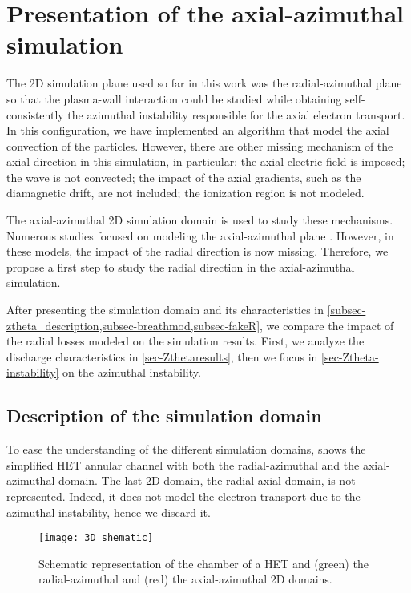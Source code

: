 
\section{Presentation of the axial-azimuthal simulation}

The \ac{2D} simulation plane used so far in this work was the radial-azimuthal plane so that the plasma-wall interaction could be studied while obtaining self-consistently the azimuthal instability responsible for the axial electron transport.
In this configuration, we have implemented an algorithm that model the axial convection of the particles.
However, there are other missing mechanism of the axial direction in this simulation, in particular\string: the axial electric field is imposed\string; the wave is not convected\string; the impact of the axial gradients, such as the diamagnetic drift, are not included\string; the ionization region is not modeled.

The axial-azimuthal \ac{2D} simulation domain is used to study these mechanisms.
Numerous  studies focused on modeling the axial-azimuthal plane \citep{adam2004,coche2014,boeuf2018,taccogna2019}.
However, in these models, the impact of the radial direction is now missing.
Therefore, we propose a first step to study the radial direction in the axial-azimuthal simulation.

After presenting the simulation domain and its characteristics in \cref{subsec-ztheta_description,subsec-breathmod,subsec-fakeR}, we compare the impact of the radial losses modeled on the simulation results.
First, we analyze the discharge characteristics in \cref{sec-Zthetaresults}, then we focus in \cref{sec-Ztheta-instability} on the azimuthal instability.


\subsection{Description of the simulation domain} \label{subsec-ztheta_description}
To ease the understanding of the different simulation domains,  shows the simplified \ac{HET} annular channel with both the radial-azimuthal and the axial-azimuthal \ztheta domain.
The last \ac{2D} domain, the radial-axial domain, is not represented.
Indeed, it does not model the electron transport due to the azimuthal instability, hence we discard it.

\begin{figure}[hbt]
  \centering
  \texttt{[image: 3D\_shematic]}
  \caption{Schematic representation of the chamber of a \ac{HET} and (green) the radial-azimuthal and (red) the axial-azimuthal 2D domains.}
  \label{fig-3Dschematic}
\end{figure}

